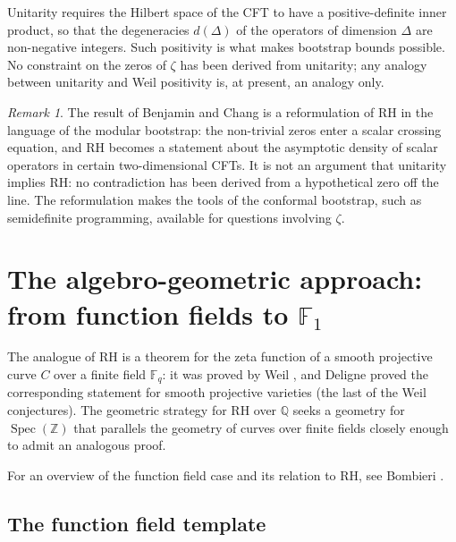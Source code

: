 \documentclass[11pt]{amsart}
\theoremstyle{definition}
\theoremstyle{remark}
\newtheorem{remark}[theorem]{Remark}
\begin{document}
Unitarity requires the Hilbert space of the CFT to have a positive-definite inner product, so that the degeneracies $d(\Delta)$ of the operators of dimension $\Delta$ are non-negative integers. Such positivity is what makes bootstrap bounds possible. No constraint on the zeros of $\zeta$ has been derived from unitarity; any analogy between unitarity and Weil positivity is, at present, an analogy only.

\begin{remark}
The result of Benjamin and Chang is a reformulation of RH in the language of the modular bootstrap: the non-trivial zeros enter a scalar crossing equation, and RH becomes a statement about the asymptotic density of scalar operators in certain two-dimensional CFTs. It is not an argument that unitarity implies RH: no contradiction has been derived from a hypothetical zero off the line. The reformulation makes the tools of the conformal bootstrap, such as semidefinite programming, available for questions involving $\zeta$.
\end{remark}

\section{The algebro-geometric approach: from function fields to \texorpdfstring{$\mathbb{F}_1$}{F1}}\label{sec:geometric}

The analogue of RH is a theorem for the zeta function of a smooth projective curve $C$ over a finite field $\mathbb{F}_q$: it was proved by Weil \cite{weil1948}, and Deligne \cite{deligne1974} proved the corresponding statement for smooth projective varieties (the last of the Weil conjectures). The geometric strategy for RH over $\mathbb{Q}$ seeks a geometry for $\operatorname{Spec}(\mathbb{Z})$ that parallels the geometry of curves over finite fields closely enough to admit an analogous proof.

For an overview of the function field case and its relation to RH, see Bombieri \cite{bombieri2000}.

\subsection{The function field template}\label{sec:ff}
\end{document}
